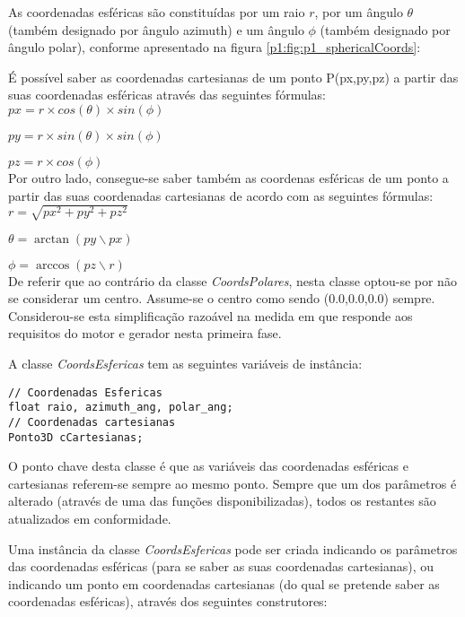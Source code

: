 As coordenadas esféricas são constituídas por um raio $r$, por um ângulo $\theta$ (também designado por ângulo azimuth) e um ângulo $\phi$ (também designado por ângulo polar), conforme apresentado na figura \ref{p1:fig:p1_sphericalCoords}:



É possível saber as coordenadas cartesianas de um ponto P(px,py,pz) a partir das suas coordenadas esféricas através das seguintes fórmulas:\\

		$px = r \times cos(\theta) \times sin(\phi)$
		
		$py = r \times sin(\theta) \times sin(\phi) $
		
		$pz = r \times cos(\phi)$\\


Por outro lado, consegue-se saber também as coordenas esféricas de um ponto a partir das suas coordenadas cartesianas de acordo com as seguintes fórmulas:\\

		$r = \sqrt{px^2 + py^2 + pz^2}$
		
		$\theta = \arctan(py \backslash px) $
		
		$\phi = \arccos (pz \backslash r)$\\

De referir que ao contrário da classe \textit{CoordsPolares}, nesta classe optou-se por não se considerar um centro. Assume-se o centro como sendo (0.0,0.0,0.0) sempre. Considerou-se esta simplificação razoável na medida em que responde aos requisitos do motor e gerador nesta primeira fase.

A classe \textit{CoordsEsfericas} tem as seguintes variáveis de instância:

\begin{Verbatim}
// Coordenadas Esfericas
float raio, azimuth_ang, polar_ang;
// Coordenadas cartesianas
Ponto3D cCartesianas;
\end{Verbatim}

O ponto chave desta classe é que as variáveis das coordenadas esféricas e cartesianas referem-se sempre ao mesmo ponto. Sempre que um dos parâmetros é alterado (através de uma das funções disponibilizadas), todos os restantes são atualizados em conformidade.

Uma instância da classe \textit{CoordsEsfericas} pode ser criada indicando os parâmetros das coordenadas esféricas (para se saber as suas coordenadas cartesianas), ou indicando um ponto em coordenadas cartesianas (do qual se pretende saber as coordenadas esféricas), através dos seguintes construtores:

